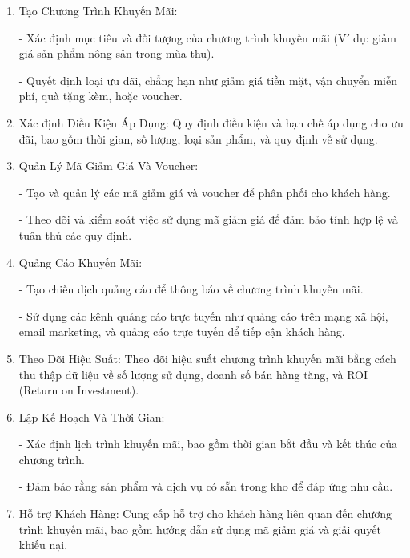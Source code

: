         \begin{enumerate}
            \item Tạo Chương Trình Khuyến Mãi:
        
        - Xác định mục tiêu và đối tượng của chương trình khuyến mãi (Ví dụ: giảm giá sản phẩm nông sản trong mùa thu).
        
        - Quyết định loại ưu đãi, chẳng hạn như giảm giá tiền mặt, vận chuyển miễn phí, quà tặng kèm, hoặc voucher.
            \item Xác định Điều Kiện Áp Dụng:
        Quy định điều kiện và hạn chế áp dụng cho ưu đãi, bao gồm thời gian, số lượng, loại sản phẩm, và quy định về sử dụng.
            \item Quản Lý Mã Giảm Giá Và Voucher:
        
        - Tạo và quản lý các mã giảm giá và voucher để phân phối cho khách hàng.
        
        - Theo dõi và kiểm soát việc sử dụng mã giảm giá để đảm bảo tính hợp lệ và tuân thủ các quy định.
            \item Quảng Cáo Khuyến Mãi:
        
        - Tạo chiến dịch quảng cáo để thông báo về chương trình khuyến mãi.
        
        - Sử dụng các kênh quảng cáo trực tuyến như quảng cáo trên mạng xã hội, email marketing, và quảng cáo trực tuyến để tiếp cận khách hàng.
            \item Theo Dõi Hiệu Suất:
        Theo dõi hiệu suất chương trình khuyến mãi bằng cách thu thập dữ liệu về số lượng sử dụng, doanh số bán hàng tăng, và ROI (Return on Investment).
            \item Lập Kế Hoạch Và Thời Gian:
        
        - Xác định lịch trình khuyến mãi, bao gồm thời gian bắt đầu và kết thúc của chương trình.
        
        - Đảm bảo rằng sản phẩm và dịch vụ có sẵn trong kho để đáp ứng nhu cầu.
            \item Hỗ trợ Khách Hàng:
        Cung cấp hỗ trợ cho khách hàng liên quan đến chương trình khuyến mãi, bao gồm hướng dẫn sử dụng mã giảm giá và giải quyết khiếu nại.
            
        \end{enumerate}
        
